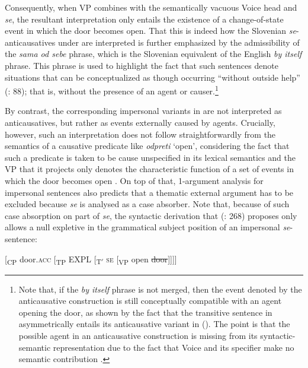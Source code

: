 \documentclass[output=paper,
modfonts,nonflat,
newtxmath
]{langsci/langscibook}
\begin{document}
\noindent Consequently, when VP combines with the semantically vacuous Voice head and \textit{se}, the resultant interpretation only entails the existence of a change-of-state event in which the door becomes open. That this is indeed how the Slovenian \textit{se}-anticausatives under  are interpreted is further emphasized by the admissibility of the \textit{sama od sebe} phrase, which is the Slovenian equivalent of the English \textit{by itself} phrase. This phrase is used to highlight the fact that such sentences denote situations that can be conceptualized as though occurring “without outside help'' (\citealt{hovav1995}: 88); that is, without the presence of an agent or causer.\footnote{Note that, if the \textit{by itself} phrase is not merged, then the event denoted by the anticausative construction is still conceptually compatible with an agent opening the door, as shown by the fact that the transitive sentence in  asymmetrically entails its anticausative variant in  (\citealt{schafervivanco2016}). The point is that the possible agent in an anticausative construction is missing from its syntactic-semantic representation due to the fact that Voice and its specifier make no semantic contribution .} \par

By contrast, the corresponding impersonal variants in  are not interpreted as anticausatives, but rather as events externally caused by agents. Crucially, however, such an interpretation does not follow straightforwardly from the semantics of a causative predicate like \textit{odpreti} `open', considering the fact that such a predicate is taken to be cause unspecified in its lexical semantics and the VP that it projects only denotes the characteristic function of a set of events in which the door becomes open . On top of that,  1-argument analysis for impersonal sentences also predicts that a thematic external argument has to be excluded because \textit{se} is analysed as a case absorber. Note that, because of such case absorption on part of \textit{se}, the syntactic derivation that \citeauthor{marelj2004} (\citeyear{marelj2004}: 268) proposes only allows a null expletive in the grammatical subject position of an impersonal \textit{se}-sentence: \par
\begin{exe}
\ex \label{ex:lenardic: 9} {[\textsubscript{CP} door.\textsc{acc} [\textsubscript{TP} EXPL [\textsubscript{T$'$} \textsc{se} [\textsubscript{VP} open \st{door}]]]]}
\end{exe} \par
\end{document}
